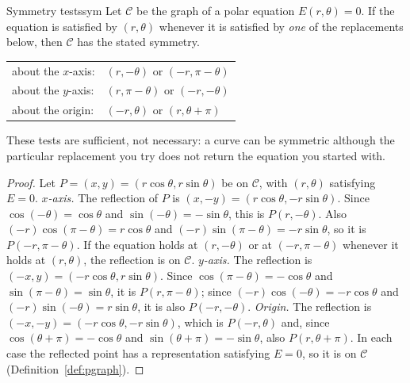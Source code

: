 \documentclass[11pt]{article}
\begin{document}
\begin{thm}{Symmetry tests}{sym}
Let $\mathcal C$ be the graph of a polar equation $E(r,\theta)=0$. If the equation is satisfied by $(r,\theta)$ whenever it is satisfied by \emph{one} of the replacements below, then $\mathcal C$ has the stated symmetry.
\begin{center}
\begin{tabular}{ll}
about the $x$-axis: & $(r,-\theta)$  or $(-r,\pi-\theta)$\\
about the $y$-axis: & $(r,\pi-\theta)$  or $(-r,-\theta)$\\
about the origin: & $(-r,\theta)$  or $(r,\theta+\pi)$
\end{tabular}
\end{center}
These tests are sufficient, not necessary: a curve can be symmetric although the particular replacement you try does not return the equation you started with.
\end{thm}
\begin{proof}
Let $P=(x,y)=(r\cos\theta,r\sin\theta)$ be on $\mathcal C$, with $(r,\theta)$ satisfying $E=0$.
\emph{$x$-axis.} The reflection of $P$ is $(x,-y)=(r\cos\theta,-r\sin\theta)$. Since $\cos(-\theta)=\cos\theta$ and $\sin(-\theta)=-\sin\theta$, this is $P(r,-\theta)$. Also $(-r)\cos(\pi-\theta)=r\cos\theta$ and $(-r)\sin(\pi-\theta)=-r\sin\theta$, so it is $P(-r,\pi-\theta)$. If the equation holds at $(r,-\theta)$ or at $(-r,\pi-\theta)$ whenever it holds at $(r,\theta)$, the reflection is on $\mathcal C$.
\emph{$y$-axis.} The reflection is $(-x,y)=(-r\cos\theta,r\sin\theta)$. Since $\cos(\pi-\theta)=-\cos\theta$ and $\sin(\pi-\theta)=\sin\theta$, it is $P(r,\pi-\theta)$; since $(-r)\cos(-\theta)=-r\cos\theta$ and $(-r)\sin(-\theta)=r\sin\theta$, it is also $P(-r,-\theta)$.
\emph{Origin.} The reflection is $(-x,-y)=(-r\cos\theta,-r\sin\theta)$, which is $P(-r,\theta)$ and, since $\cos(\theta+\pi)=-\cos\theta$ and $\sin(\theta+\pi)=-\sin\theta$, also $P(r,\theta+\pi)$.
In each case the reflected point has a representation satisfying $E=0$, so it is on $\mathcal C$ (Definition~\ref{def:pgraph}).
\end{proof}
\end{document}
